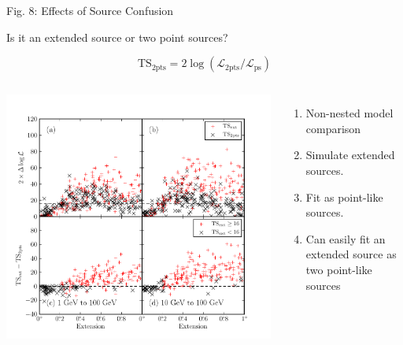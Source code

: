 \documentclass[12pt]{beamer}
\begin{document}
\begin{frame}{Fig. 8: Effects of Source Confusion}

Is it an extended source or two point sources?

        \begin{equation*}
          \text{TS}_\text{2pts} =  
          2 \log(\mathcal{L}_\text{2pts}/\mathcal{L}_\text{ps})
        \end{equation*}

  \begin{columns}
    \includegraphics[scale=0.40]{plots/confusion_extended_plot_color.pdf}
    \begin{enumerate}
      \item Non-nested model comparison
      \item Simulate extended sources. 
      \item Fit as point-like sources.
      \item Can easily fit an extended
      source as two point-like sources
    \end{enumerate}
  \end{columns}
\end{frame}
\end{document}
